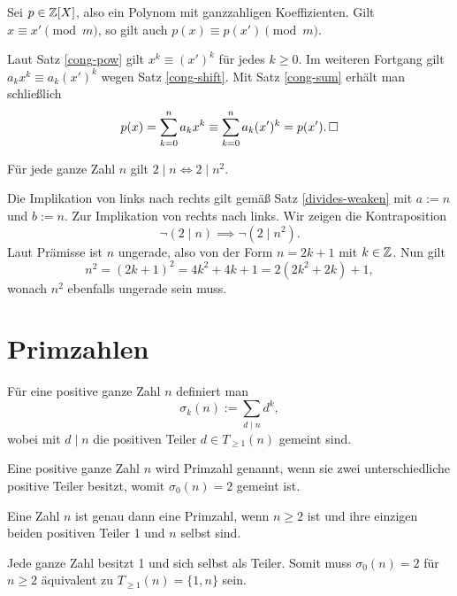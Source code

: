 \begin{Satz}
Sei $p\in\mathbb Z[X]$, also ein Polynom mit ganzzahligen Koeffizienten.
Gilt $x\equiv x'\pmod m$, so gilt auch $p(x)\equiv p(x')\pmod m$.
\end{Satz}
\begin{Beweis}
Laut Satz \ref{cong-pow} gilt $x^k\equiv (x')^k$ für jedes
$k\ge 0$. Im weiteren Fortgang gilt $a_k x^k\equiv a_k (x')^k$
wegen Satz \ref{cong-shift}. Mit Satz \ref{cong-sum} erhält man
schließlich
\[p(x) = \sum_{k=0}^n a_k x^k\equiv\sum_{k=0}^n a_k (x')^k = p(x').\,\square\]
\end{Beweis}

\begin{Satz}
Für jede ganze Zahl $n$ gilt $2\mid n \iff 2\mid n^2$.
\end{Satz}
\begin{Beweis}
Die Implikation von links nach rechts gilt gemäß
Satz \ref{divides-weaken} mit $a:=n$ und $b:=n$.
Zur Implikation von rechts nach links. Wir zeigen die Kontraposition
\[\neg(2\mid n) \implies \neg(2\mid n^2).\]
Laut Prämisse ist $n$ ungerade, also von der Form $n=2k+1$ mit $k\in\mathbb Z$.
Nun gilt
\[n^2 = (2k+1)^2 = 4k^2 + 4k + 1 = 2(2k^2 + 2k) + 1,\]
wonach $n^2$ ebenfalls ungerade sein muss.\,\qedsymbol
\end{Beweis}

\section{Primzahlen}

\begin{Definition}[Teilerfunktion]\newlinefirst
Für eine positive ganze Zahl $n$ definiert man
\[\sigma_k(n) := \sum_{d\mid n} d^k,\]
wobei mit $d\mid n$ die positiven Teiler $d\in T_{\ge 1}(n)$ gemeint
sind.
\end{Definition}

\begin{Definition}[Primzahl]\newlinefirst
Eine positive ganze Zahl $n$ wird Primzahl genannt, wenn sie
zwei unterschiedliche positive Teiler besitzt, womit $\sigma_0(n)=2$
gemeint ist.
\end{Definition}

\begin{Satz}
Eine Zahl $n$ ist genau dann eine Primzahl, wenn $n\ge 2$ ist und
ihre einzigen beiden positiven Teiler 1 und $n$ selbst sind.
\end{Satz}
\begin{Beweis}
Jede ganze Zahl besitzt 1 und sich selbst als Teiler. Somit muss
$\sigma_0(n)=2$ für $n\ge 2$ äquivalent zu $T_{\ge 1}(n)=\{1,n\}$
sein.\,\qedsymbol
\end{Beweis}

